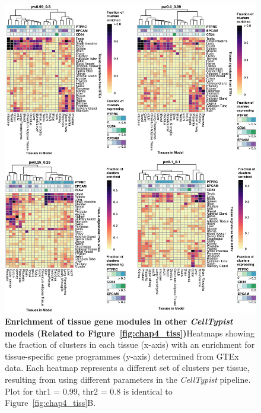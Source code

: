 \begin{figure}[ht!] 
\centering
\includegraphics[scale=0.77]{Appendix3/Figs/appB_tissueGSEA.png} %
\caption[Enrichment of tissue gene modules in other \textit{CellTypist} models]{\textbf{Enrichment of tissue gene modules in other \textit{CellTypist} models (Related to Figure~\ref{fig:chap4_tiss})}\newline Heatmaps showing the fraction of clusters in each tissue (x-axis) with an enrichment for tissue-specific gene programmes (y-axis) determined from GTEx data. Each heatmap represents a different set of clusters per tissue, resulting from using different parameters in the \textit{CellTypist} pipeline. Plot for thr1 = 0.99, thr2 = 0.8 is identical to Figure~\ref{fig:chap4_tiss}B.}
\label{fig:appB_tissGSEA}
\end{figure}


